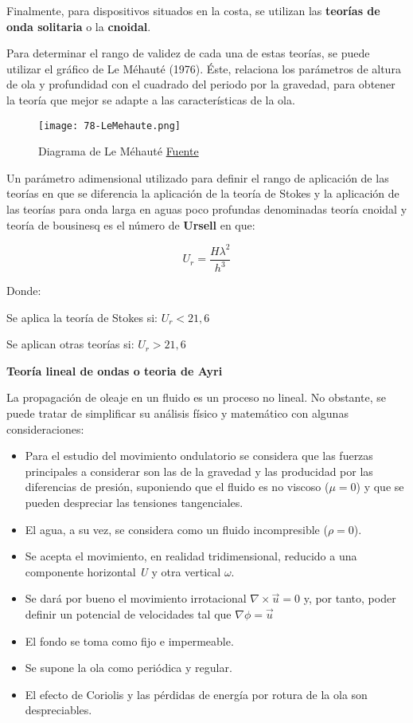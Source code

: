 Finalmente, para dispositivos situados en la costa, se utilizan las
\textbf{teorías de onda solitaria} o la \textbf{cnoidal}.

Para determinar el rango de validez de cada una de estas teorías, se
puede utilizar el gráfico de Le Méhauté (1976). Éste, relaciona los
parámetros de altura de ola y profundidad con el cuadrado del periodo
por la gravedad, para obtener la teoría que mejor se adapte a las
características de la ola.

\begin{figure}
\centering
\texttt{[image: 78-LeMehaute.png]}
\caption[Diagrama de Le Méhauté]{Diagrama de Le Méhauté \href{http://upcommons.upc.edu/pfc/handle/2099.1/13595}{Fuente}}
\end{figure}

Un parámetro adimensional utilizado para definir el rango de aplicación
de las teorías en que se diferencia la aplicación de la teoría de Stokes
y la aplicación de las teorías para onda larga en aguas poco profundas
denominadas teoría cnoidal y teoría de bousinesq es el número de
\textbf{Ursell} en que:

\[U_r= \frac{H\lambda^2}{h^3}\]

Donde:

 Se aplica la teoría de Stokes si: \(U_r<21,6\)

 Se aplican otras teorías si: \(U_r>21,6\)

\textbf{Teoría lineal de ondas o teoria de
Ayri}

La propagación de oleaje en un fluido es un proceso no lineal. No
obstante, se puede tratar de simplificar su análisis físico y matemático
con algunas consideraciones:

\begin{itemize}
\item
  Para el estudio del movimiento ondulatorio se considera que las
  fuerzas principales a considerar son las de la gravedad y las
  producidad por las diferencias de presión, suponiendo que el fluido es
  no viscoso (\(\mu=0\)) y que se pueden despreciar las tensiones
  tangenciales.
\item
  El agua, a su vez, se considera como un fluido incompresible
  (\(\rho =0\)).
\item
  Se acepta el movimiento, en realidad tridimensional, reducido a una
  componente horizontal \emph{U} y otra vertical \(\omega\).
\item
  Se dará por bueno el movimiento irrotacional
  \(\nabla \times \vec u=0\) y, por tanto, poder definir un potencial de
  velocidades tal que \(\nabla \phi=\vec u\)
\item
  El fondo se toma como fijo e impermeable.
\item
  Se supone la ola como periódica y regular.
\item
  El efecto de Coriolis y las pérdidas de energía por rotura de la ola
  son despreciables.
\end{itemize}

